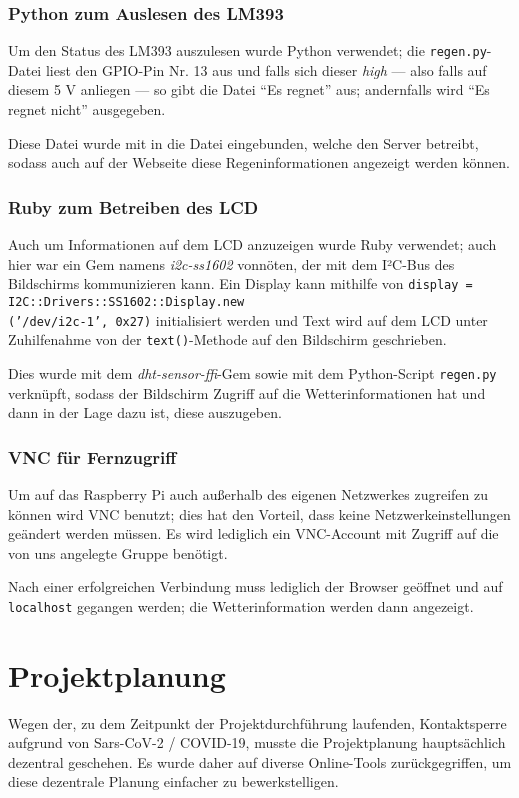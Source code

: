 \documentclass[a4paper,12pt]{article}
\begin{document}
\subsubsection{Python zum Auslesen des LM393}
Um den Status des LM393 auszulesen wurde Python verwendet; die \texttt{regen.py}-Datei liest den GPIO-Pin Nr. 13 aus und falls sich dieser \textit{high} — also falls auf diesem 5 V anliegen — so gibt die Datei "`Es regnet"' aus; andernfalls wird "`Es regnet nicht"' ausgegeben.

Diese Datei wurde mit in die Datei eingebunden, welche den Server betreibt, sodass auch auf der Webseite diese Regeninformationen angezeigt werden können.

\subsubsection{Ruby zum Betreiben des LCD}
Auch um Informationen auf dem LCD anzuzeigen wurde Ruby verwendet; auch hier war ein Gem namens \textit{i2c-ss1602} vonnöten, der mit dem I²C-Bus des Bildschirms kommunizieren kann.
Ein Display kann mithilfe von \texttt{display = I2C::Drivers::SS1602::Display.new\\('/dev/i2c-1', 0x27)} initialisiert werden und Text wird auf dem LCD unter Zuhilfenahme von der \texttt{text()}-Methode auf den Bildschirm geschrieben.

Dies wurde mit dem \textit{dht-sensor-ffi}-Gem sowie mit dem Python-Script \texttt{regen.py} verknüpft, sodass der Bildschirm Zugriff auf die Wetterinformationen hat und dann in der Lage dazu ist, diese auszugeben.

\subsubsection{VNC für Fernzugriff}
Um auf das Raspberry Pi auch außerhalb des eigenen Netzwerkes zugreifen zu können wird VNC benutzt; dies hat den Vorteil, dass keine Netzwerkeinstellungen geändert werden müssen. Es wird lediglich ein VNC-Account mit Zugriff auf die von uns angelegte Gruppe benötigt.

Nach einer erfolgreichen Verbindung muss lediglich der Browser geöffnet und auf \texttt{localhost} gegangen werden; die Wetterinformation werden dann angezeigt.

\pagebreak
\section{Projektplanung}
Wegen der, zu dem Zeitpunkt der Projektdurchführung laufenden, Kontaktsperre aufgrund von Sars-CoV-2 / COVID-19, musste die Projektplanung hauptsächlich dezentral geschehen.
Es wurde daher auf diverse Online-Tools zurückgegriffen, um diese dezentrale Planung einfacher zu bewerkstelligen.
\end{document}
